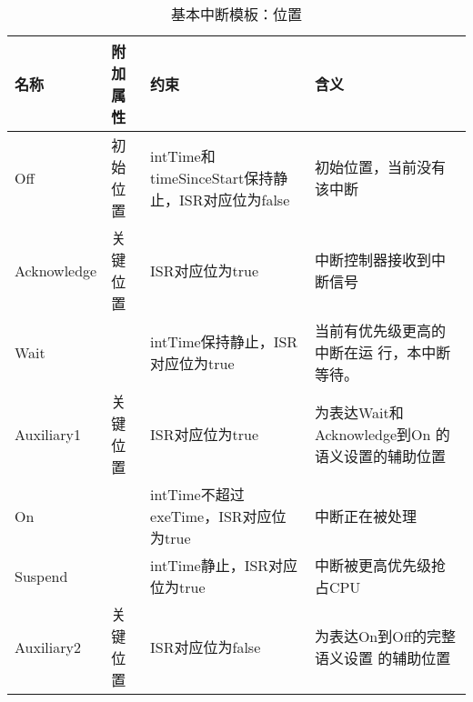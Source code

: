 \begin{table}[!htb]
	\centering
	\caption{基本中断模板：位置}
	\label{tab:basic_intr_loc}
	\begin{tabularx}{\linewidth}{p{5em}p{5em}p{13em}X}
		\toprule[1.5pt]
		{\heiti 名称} & {\heiti 附加属性} & {\heiti 约束} & {\heiti 含义}\\
		\midrule[1pt]
		Off & 初始位置 & intTime和timeSinceStart保持静止，ISR对应位为false & 
		初始位置，当前没有该中断\\
		\midrule[0.5pt]
		Acknowledge & 关键位置 & ISR对应位为true & 中断控制器接收到中断信号\\
		\midrule[0.5pt]
		Wait & & intTime保持静止，ISR对应位为true & 当前有优先级更高的中断在运
		行，本中断等待。\\
		\midrule[0.5pt]
		Auxiliary1 & 关键位置 & ISR对应位为true & 为表达Wait和Acknowledge到On
		的语义设置的辅助位置\\
		\midrule[0.5pt]
		On & & intTime不超过exeTime，ISR对应位为true & 中断正在被处理 \\
		\midrule[0.5pt]
		Suspend & & intTime静止，ISR对应位为true & 中断被更高优先级抢占CPU \\ 
		\midrule[0.5pt]
		Auxiliary2 & 关键位置 & ISR对应位为false & 为表达On到Off的完整语义设置
		的辅助位置\\
		\bottomrule[1.5pt]
	\end{tabularx}
\end{table}


